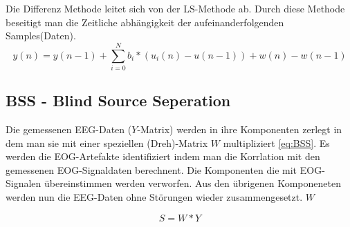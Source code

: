 \documentclass[preprint,12pt]{elsarticle}
\begin{document}
Die Differenz Methode leitet sich von der LS-Methode ab. Durch diese Methode beseitigt man die Zeitliche abhängigkeit der aufeinanderfolgenden Samples(Daten).
~\cite{Thulasidas2004}
\begin{equation} \label{eq:DM}
 y(n) = y(n - 1) + \sum_{i=0}^{N}  b_i * (u_i(n) - u(n - 1)) + w(n) - w(n - 1)
\end{equation}



\subsection{BSS - Blind Source Seperation}
Die gemessenen EEG-Daten ($Y$-Matrix) werden in ihre Komponenten zerlegt in dem man sie mit einer speziellen (Dreh)-Matrix $W$ multipliziert \ref{eq:BSS}.
Es werden die EOG-Artefakte identifiziert indem man die Korrlation mit den gemessenen EOG-Signaldaten  berechnent. Die Komponenten die mit EOG-Signalen übereinstimmen werden
verworfen. Aus den übrigenen Komponeneten werden nun die EEG-Daten ohne Störungen wieder zusammengesetzt.
$W$
~\cite{Thulasidas2004}

\begin{equation} \label{eq:BSS}
 S = W*Y
\end{equation}
















\end{document}
